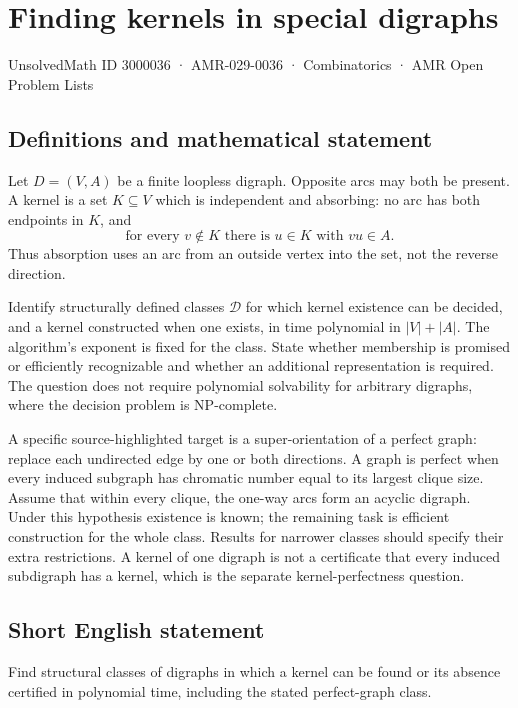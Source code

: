 \documentclass[11pt,a4paper]{article}
\begin{document}
\section*{Finding kernels in special digraphs}\label{3000036}
{\small UnsolvedMath ID 3000036 · AMR-029-0036 · Combinatorics · AMR Open Problem Lists}
\subsection{Definitions and mathematical statement}
Let $D=(V,A)$ be a finite loopless digraph. Opposite arcs may both be
present. A kernel is a set $K\subseteq V$ which is independent and
absorbing: no arc has both endpoints in $K$, and
\[
             \text{for every }v\notin K\text{ there is }u\in K
                         \text{ with }vu\in A.
\]
Thus absorption uses an arc from an outside vertex into the set, not
the reverse direction.

Identify structurally defined classes $\mathcal D$ for which kernel
existence can be decided, and a kernel constructed when one exists,
in time polynomial in $|V|+|A|$. The algorithm's exponent is fixed
for the class. State whether membership is promised or efficiently
recognizable and whether an additional representation is required.
The question does not require polynomial solvability for arbitrary
digraphs, where the decision problem is NP-complete.

A specific source-highlighted target is a super-orientation of a perfect
graph: replace each undirected edge by one or both directions. A graph
is perfect when every induced subgraph has chromatic number equal to
its largest clique size. Assume that within every clique, the one-way
arcs form an acyclic digraph. Under this hypothesis existence is known;
the remaining task is efficient construction for the whole class.
Results for narrower classes should specify their extra restrictions.
A kernel of one digraph is not a certificate that every induced
subdigraph has a kernel, which is the separate kernel-perfectness question.
\subsection{Short English statement}
Find structural classes of digraphs in which a kernel can be found or its absence certified in polynomial time, including the stated perfect-graph class.
\end{document}
